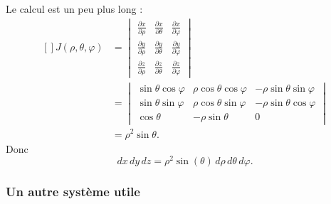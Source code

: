 Le calcul est un peu plus long :
\begin{equation}
    \begin{aligned}[]
        J(\rho,\theta,\varphi)&=\begin{vmatrix}
            \frac{ \partial x }{ \partial \rho }    &   \frac{ \partial x }{ \partial \theta }    &   \frac{ \partial x }{ \partial \varphi }    \\
            \frac{ \partial y }{ \partial \rho }    &   \frac{ \partial y }{ \partial \theta }    &   \frac{ \partial y }{ \partial \varphi }    \\
            \frac{ \partial z }{ \partial \rho }    &   \frac{ \partial z }{ \partial \theta }    &   \frac{ \partial z }{ \partial \varphi }    
        \end{vmatrix}\\ 
        &=
        \begin{vmatrix}
            \sin\theta\cos\varphi    &   \rho\cos\theta\cos\varphi    &   -\rho\sin\theta\sin\varphi    \\
            \sin\theta\sin\varphi    &   \rho\cos\theta\sin\varphi    &   -\rho\sin\theta\cos\varphi    \\
            \cos\theta               &   -\rho\sin\theta              &   0
        \end{vmatrix}\\
        &=\rho^2\sin\theta.
    \end{aligned}
\end{equation}
Donc 
\begin{equation}
    dx\,dy\,dz=\rho^2\sin(\theta)\,d\rho\,d\theta\,d\varphi.
\end{equation}

\subsubsection{Un autre système utile}

